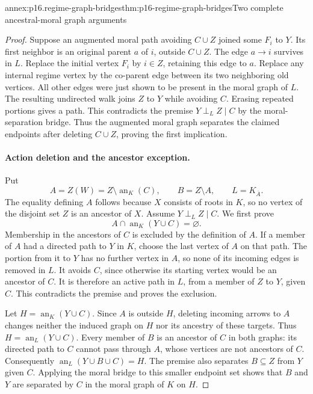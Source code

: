 \begin{annexitem}{annex:p16.regime-graph-bridges}{thm:p16-regime-graph-bridges}{Two complete ancestral-moral graph arguments}
\begin{proof}
Suppose an augmented moral path avoiding \(C\cup Z\) joined
some \(F_i\) to \(Y\). Its first neighbor is an original parent
\(a\) of \(i\), outside \(C\cup Z\). The edge \(a\to i\)
survives in \(L\). Replace the initial vertex \(F_i\) by
\(i\in Z\), retaining this edge to \(a\). Replace any internal
regime vertex by the co-parent edge between its two neighboring old
vertices. All other edges were just shown to be present in the moral
graph of \(L\). The resulting undirected walk joins \(Z\) to
\(Y\) while avoiding \(C\). Erasing repeated portions gives a
path. This contradicts the premise
\(Y\mathrel{\perp_L}Z\mid C\) by the moral-separation bridge.
Thus the augmented moral graph separates the claimed endpoints after
deleting \(C\cup Z\), proving the first implication.

\paragraph{Action deletion and the ancestor exception.}
Put
\[
 A=Z(W)=Z\setminus\operatorname{an}_K(C),\qquad B=Z\setminus A,
 \qquad L=K_{\overline A}.
\]
The equality defining \(A\) follows because \(X\) consists of
roots in \(K\), so no vertex of the disjoint set \(Z\) is an
ancestor of \(X\). Assume \(Y\mathrel{\perp_L}Z\mid C\).
We first prove
\[
 A\cap\operatorname{an}_K(Y\cup C)=\varnothing.
\]
Membership in the ancestors of \(C\) is excluded by the definition
of \(A\). If a member of \(A\) had a directed path to \(Y\)
in \(K\), choose the last vertex of \(A\) on that path.
The portion from it to \(Y\) has no further vertex in \(A\),
so none of its incoming edges is removed in \(L\). It avoids
\(C\), since otherwise its starting vertex would be an ancestor
of \(C\). It is therefore an active path in \(L\), from a
member of \(Z\) to \(Y\), given \(C\). This contradicts
the premise and proves the exclusion.

Let \(H=\operatorname{an}_K(Y\cup C)\). Since \(A\) is
outside \(H\), deleting incoming arrows to \(A\) changes
neither the induced graph on \(H\) nor its ancestry of these
targets. Thus \(H=\operatorname{an}_L(Y\cup C)\).
Every member of \(B\) is an ancestor of \(C\) in both graphs:
its directed path to \(C\) cannot pass through \(A\), whose
vertices are not ancestors of \(C\). Consequently
\(\operatorname{an}_L(Y\cup B\cup C)=H\).
The premise also separates \(B\subseteq Z\) from \(Y\)
given \(C\). Applying the moral bridge to this smaller endpoint
set shows that \(B\) and \(Y\) are separated by \(C\) in
the moral graph of \(K\) on \(H\).


\end{proof}
\end{annexitem}

